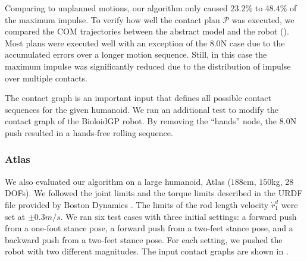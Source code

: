 Comparing to unplanned motions, our algorithm only caused $23.2\%$ to
$48.4\%$ of the maximum impulse. To verify how well the
contact plan $\mathcal{P}$ was executed, we compared the COM
trajectories between the abstract model and the robot
(). Most plans were executed well with an exception of the
$8.0$N case due to the accumulated errors over a longer motion
sequence. Still, in this case the maximum impulse was significantly
reduced due to the distribution of impulse over multiple contacts.

The contact graph is an important input that defines all possible
contact sequences for the given humanoid. We ran an additional test to
modify the contact graph of the BioloidGP robot. By removing the
``hands'' node, the $8.0$N push resulted in a hands-free rolling sequence.

\subsubsection{Atlas}
We also evaluated our algorithm on a large humanoid, Atlas ($188$cm,
$150$kg, $28$DOFs).  We followed the joint limits and the torque
limits described in the URDF file provided by Boston Dynamics
\cite{BD:2014:URL}. The limits of the rod length velocity
$\dot{r}_1^d$ were set at $\pm0.3m/s$.  We ran six test cases with
three initial settings: a forward push from a one-foot stance pose, a
forward push from a two-feet stance pose, and a backward push from a
two-feet stance pose. For each setting, we pushed the robot with two
different magnitudes.  The input contact graphs are shown in
.

